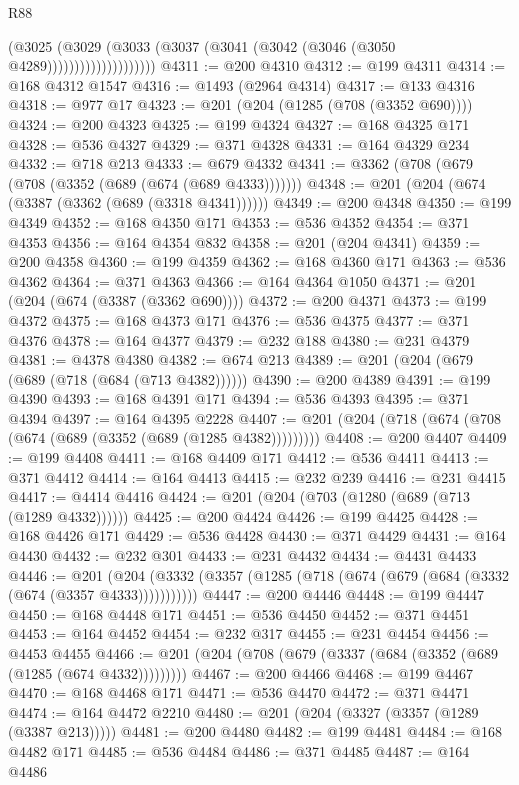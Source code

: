 \begin{lexlean}{R88}
\begin{coremodule}
                            (@3025
                              (@3029
                                (@3033 (@3037 (@3041 (@3042 (@3046 (@3050 @4289))))))))))))))))))))
@4311 := @200 @4310
@4312 := @199 @4311
@4314 := @168 @4312 @1547
@4316 := @1493 (@2964 @4314)
@4317 := @133 @4316
@4318 := @977 @17
@4323 := @201 (@204 (@1285 (@708 (@3352 @690))))
@4324 := @200 @4323
@4325 := @199 @4324
@4327 := @168 @4325 @171
@4328 := @536 @4327
@4329 := @371 @4328
@4331 := @164 @4329 @234
@4332 := @718 @213
@4333 := @679 @4332
@4341 := @3362 (@708 (@679 (@708 (@3352 (@689 (@674 (@689 @4333)))))))
@4348 := @201 (@204 (@674 (@3387 (@3362 (@689 (@3318 @4341))))))
@4349 := @200 @4348
@4350 := @199 @4349
@4352 := @168 @4350 @171
@4353 := @536 @4352
@4354 := @371 @4353
@4356 := @164 @4354 @832
@4358 := @201 (@204 @4341)
@4359 := @200 @4358
@4360 := @199 @4359
@4362 := @168 @4360 @171
@4363 := @536 @4362
@4364 := @371 @4363
@4366 := @164 @4364 @1050
@4371 := @201 (@204 (@674 (@3387 (@3362 @690))))
@4372 := @200 @4371
@4373 := @199 @4372
@4375 := @168 @4373 @171
@4376 := @536 @4375
@4377 := @371 @4376
@4378 := @164 @4377
@4379 := @232 @188
@4380 := @231 @4379
@4381 := @4378 @4380
@4382 := @674 @213
@4389 := @201 (@204 (@679 (@689 (@718 (@684 (@713 @4382))))))
@4390 := @200 @4389
@4391 := @199 @4390
@4393 := @168 @4391 @171
@4394 := @536 @4393
@4395 := @371 @4394
@4397 := @164 @4395 @2228
@4407 := @201 (@204 (@718 (@674 (@708 (@674 (@689 (@3352 (@689 (@1285 @4382)))))))))
@4408 := @200 @4407
@4409 := @199 @4408
@4411 := @168 @4409 @171
@4412 := @536 @4411
@4413 := @371 @4412
@4414 := @164 @4413
@4415 := @232 @239
@4416 := @231 @4415
@4417 := @4414 @4416
@4424 := @201 (@204 (@703 (@1280 (@689 (@713 (@1289 @4332))))))
@4425 := @200 @4424
@4426 := @199 @4425
@4428 := @168 @4426 @171
@4429 := @536 @4428
@4430 := @371 @4429
@4431 := @164 @4430
@4432 := @232 @301
@4433 := @231 @4432
@4434 := @4431 @4433
@4446 := @201
    (@204 (@3332 (@3357 (@1285 (@718 (@674 (@679 (@684 (@3332 (@674 (@3357 @4333)))))))))))
@4447 := @200 @4446
@4448 := @199 @4447
@4450 := @168 @4448 @171
@4451 := @536 @4450
@4452 := @371 @4451
@4453 := @164 @4452
@4454 := @232 @317
@4455 := @231 @4454
@4456 := @4453 @4455
@4466 := @201 (@204 (@708 (@679 (@3337 (@684 (@3352 (@689 (@1285 (@674 @4332)))))))))
@4467 := @200 @4466
@4468 := @199 @4467
@4470 := @168 @4468 @171
@4471 := @536 @4470
@4472 := @371 @4471
@4474 := @164 @4472 @2210
@4480 := @201 (@204 (@3327 (@3357 (@1289 (@3387 @213)))))
@4481 := @200 @4480
@4482 := @199 @4481
@4484 := @168 @4482 @171
@4485 := @536 @4484
@4486 := @371 @4485
@4487 := @164 @4486

\end{coremodule}
\end{lexlean}
